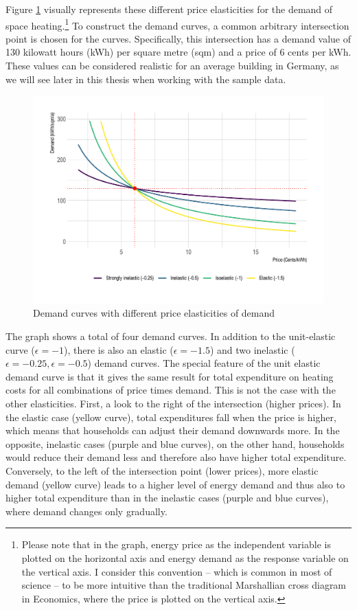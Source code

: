 \documentclass[12pt,twoside]{reedthesis}
\begin{document}
Figure \ref{fig:elasticities-conceptual} visually represents these different price elasticities for the demand of space heating.\footnote{Please note that in the graph, energy price as the independent variable is plotted on the horizontal axis and energy demand as the response variable on the vertical axis. I consider this convention -- which is common in most of science -- to be more intuitive than the traditional Marshallian cross diagram in Economics, where the price is plotted on the vertical axis.} To construct the demand curves, a common arbitrary intersection point is chosen for the curves. Specifically, this intersection has a demand value of 130 kilowatt hours (kWh) per square metre (sqm) and a price of 6 cents per kWh. These values can be considered realistic for an average building in Germany, as we will see later in this thesis when working with the sample data.
\begin{figure}

{\centering \includegraphics[width=1\linewidth]{figure/elasticities_plot} 

}

\caption{Demand curves with different price elasticities of demand}\label{fig:elasticities-conceptual}
\end{figure}
The graph shows a total of four demand curves. In addition to the unit-elastic curve (\(\epsilon = -1\)), there is also an elastic (\(\epsilon = -1.5\)) and two inelastic (\(\epsilon = -0.25, \epsilon = -0.5\)) demand curves. The special feature of the unit elastic demand curve is that it gives the same result for total expenditure on heating costs for all combinations of price times demand. This is not the case with the other elasticities. First, a look to the right of the intersection (higher prices). In the elastic case (yellow curve), total expenditures fall when the price is higher, which means that households can adjust their demand downwards more. In the opposite, inelastic cases (purple and blue curves), on the other hand, households would reduce their demand less and therefore also have higher total expenditure. Conversely, to the left of the intersection point (lower prices), more elastic demand (yellow curve) leads to a higher level of energy demand and thus also to higher total expenditure than in the inelastic cases (purple and blue curves), where demand changes only gradually.
\end{document}

